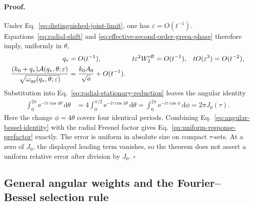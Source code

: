 \paragraph{Proof.}
Under Eq.~\eqref{eq:distinguished-joint-limit}, one has
\(\varepsilon=O(t^{-1})\).  Equations~\eqref{eq:radial-shift} and
\eqref{eq:effective-second-order-green-phase} therefore imply, uniformly in
\(\theta\),
\begin{align}
  q_*&=O(t^{-1}),
  &t\varepsilon^2W_2^{\mathrm{eff}}&=O(t^{-1}),
  &tO(\varepsilon^3)&=O(t^{-2}),                                    \notag\\
  \frac{(k_0+q_*)\mathcal A(q_*,\theta;\varepsilon)}
       {\sqrt{\omega_{qq}(q_*,\theta;\varepsilon)}}
  &=\frac{k_0A_0}{\sqrt a}+O(t^{-1}).
  \label{eq:joint-limit-radial-estimates}
\end{align}
Substitution into Eq.~\eqref{eq:radial-stationary-reduction} leaves the
angular identity
\begin{align}
  \int_0^{2\pi}\mathrm e^{-\mathrm i\tau\cos4\theta}\,\mathrm d\theta
  &=4\int_0^{\pi/2}\mathrm e^{-\mathrm i\tau\cos4\theta}\,\mathrm d\theta
    =\int_0^{2\pi}\mathrm e^{-\mathrm i\tau\cos\phi}\,\mathrm d\phi
    =2\pi J_0(\tau).
  \label{eq:angular-bessel-identity}
\end{align}
Here the change \(\phi=4\theta\) covers four identical periods.  Combining
Eq.~\eqref{eq:angular-bessel-identity} with the radial Fresnel factor gives
Eq.~\eqref{eq:uniform-response-prefactor} exactly.  The error is uniform in
absolute size on compact \(\tau\)-sets.  At a zero of \(J_0\), the displayed
leading term vanishes, so the theorem does not assert a uniform relative
error after division by \(J_0\).  \(\square\)

\subsection{General angular weights and the Fourier--Bessel selection rule}

